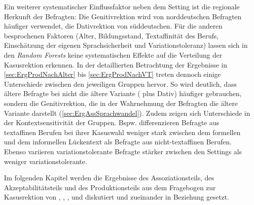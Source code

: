 Ein weiterer systematischer Einflussfaktor neben dem Setting ist die regionale Herkunft der Befragten: 
Die Genitivrektion wird von norddeutschen Befragten häufiger verwendet, die Dativrektion von süddeutschen. 
Für die anderen besprochenen Faktoren (Alter, Bildungsstand, Textaffinität des Berufs, Einschätzung der eigenen Sprachsicherheit und Variationstoleranz) lassen sich in den \textit{Random Forests} keine systematischen Effekte auf die Verteilung der Kasusrektion erkennen. 
In der detaillierten Betrachtung der Ergebnisse in \autoref{sec:ErgProdNachAlter} bis \autoref{sec:ErgProdNachVT} treten dennoch einige Unterschiede zwischen den jeweiligen Gruppen hervor. 
So wird deutlich, dass ältere Befragte bei \dank{} nicht die ältere Variante (\dank{} plus Dativ) häufiger gebrauchen, sondern die Genitivrektion, die in der Wahrnehmung der Befragten die ältere Variante darstellt (\autoref{sec:ErgAssSprachwandel}). 
Zudem zeigen sich Unterschiede in der Kontextsensitivität der Gruppen. 
Bspw. differenzieren Befragte aus textaffinen Berufen bei ihrer Kasuswahl weniger stark zwischen dem formellen und dem informellen Lückentext als Befragte aus nicht-textaffinen Berufen.
Ebenso variieren variationstolerante Befragte stärker zwischen den Settings als weniger variationstolerante. 

Im folgenden Kapitel werden die Ergebnisse des Assoziationsteils, des Akzeptabilitätsteils und des Produktionsteils aus dem Fragebogen zur Kasusrektion von \wegen, \waehrend{}, \dank, \gegenueber{} und  diskutiert und zueinander in Beziehung gesetzt. 




